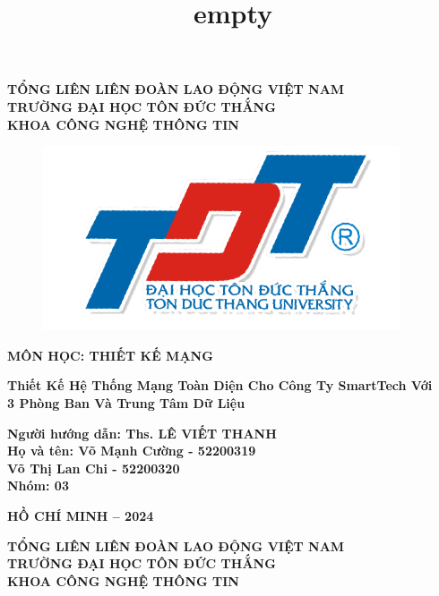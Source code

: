 \documentclass[13pt]{report}
\title{empty}
\begin{document}
	\fontsize{15pt}{15pt}\selectfont
	\begin{center}
		\textbf{TỔNG LIÊN LIÊN ĐOÀN LAO ĐỘNG VIỆT NAM \\TRƯỜNG ĐẠI HỌC TÔN ĐỨC THẮNG\\ KHOA CÔNG NGHỆ THÔNG TIN}\\
	\end{center}
	\vspace{1cm}
	\begin{figure}[h]
		\centering
		\includegraphics[width=0.3\linewidth]{img/Logo.png}
	\end{figure}	
	\fontsize{18pt}{18pt}\selectfont
	\begin{center}
		\textbf{MÔN HỌC: THIẾT KẾ MẠNG}
	\end{center}
	\vspace{1cm}
	\fontsize{18pt}{16pt}\selectfont
	\begin{center}\Huge
		\textbf{Thiết Kế Hệ Thống Mạng Toàn Diện Cho Công Ty SmartTech Với \\3 Phòng Ban Và Trung Tâm Dữ Liệu }	
	\end{center}
    \vspace{2cm}
    \fontsize{16pt}{16pt}\selectfont
    \begin{flushright}
        \textbf{Người hướng dẫn: Ths. LÊ VIẾT THANH\\ Họ và tên: Võ Mạnh Cường - 52200319 \\ Võ Thị Lan Chi - 52200320\\Nhóm: 03}
    \end{flushright}
	\vspace{2cm}
	\begin{center}
		\textbf{HỒ CHÍ MINH – 2024}
	\end{center}
    \newpage
    \fontsize{15pt}{15pt}\selectfont
	\begin{center}
		\textbf{TỔNG LIÊN LIÊN ĐOÀN LAO ĐỘNG VIỆT NAM \\TRƯỜNG ĐẠI HỌC TÔN ĐỨC THẮNG\\ KHOA CÔNG NGHỆ THÔNG TIN}\\
	\end{center}
\end{document}
